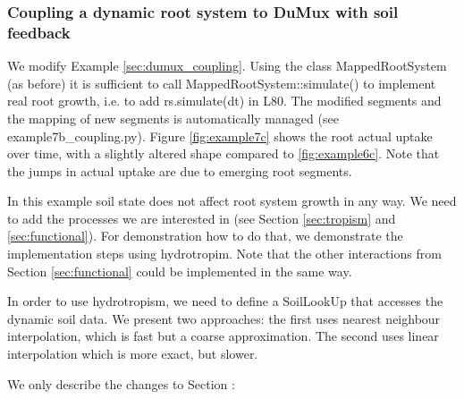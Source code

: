 
\subsubsection*{Coupling a dynamic root system to DuMux with soil feedback} \label{sec:dumux_dyn_coupling}

We modify Example \ref{sec:dumux_coupling}. Using the class MappedRootSystem (as before) it is sufficient to call MappedRootSystem::simulate() to implement real root growth, i.e. to add rs.simulate(dt) in L80. The modified segments and the mapping of new segments is automatically managed (see example7b\_coupling.py). Figure \ref{fig:example7c} shows the root actual uptake over time, with a slightly altered shape compared to \ref{fig:example6c}. Note that the jumps in actual uptake are due to emerging root segments.

In this example soil state does not affect root system growth in any way. We need to add the processes we are interested in (see Section \ref{sec:tropism} and \ref{sec:functional}). For demonstration how to do that, we demonstrate the implementation steps using hydrotropim. Note that the other interactions from Section \ref{sec:functional} could be implemented in the same way. 

In order to use hydrotropism, we need to define a SoilLookUp that accesses the dynamic soil data. We present two approaches: the first uses nearest neighbour interpolation, which is fast but a coarse approximation. The second uses linear interpolation which is more exact, but slower. 



We only describe the changes to Section \label{sec:dumux_coupling}:

